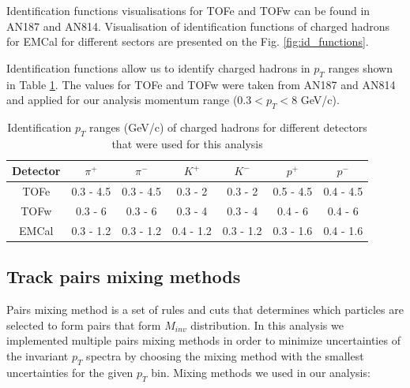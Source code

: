 Identification functions visualisations for TOFe and TOFw can be found in AN187 and AN814. Visualisation of identification functions of charged hadrons for EMCal for different sectors are presented on the Fig. \ref{fig:id_functions}.

Identification functions allow us to identify charged hadrons in $p_T$ ranges shown in Table \ref{table:id_pt_range}. The values for TOFe and TOFw were taken from AN187 and AN814 and applied for our analysis momentum range ($0.3 < p_T < 8$ GeV/c). 

\begin{table}[h!]
	\centering
	\begin{tabular}{ c || c | c | c | c | c | c }
		Detector & $\pi^+$ & $\pi^-$ & $K^+$ & $K^-$ & $p^+$ & $p^-$ \\
		\hline
		\hline
		TOFe & 0.3 - 4.5 & 0.3 - 4.5 & 0.3 - 2 & 0.3 - 2 & 0.5 - 4.5 & 0.4 - 4.5 \\
		TOFw & 0.3 - 6 & 0.3 - 6 & 0.3 - 4 & 0.3 - 4 & 0.4 - 6 & 0.4 - 6 \\
		EMCal & 0.3 - 1.2 & 0.3 - 1.2 & 0.4 - 1.2 & 0.3 - 1.2 & 0.3 - 1.6 & 0.4 - 1.6 \\
	\end{tabular}
	\caption{Identification $p_T$ ranges (GeV/c) of charged hadrons for different detectors that were used for this analysis}
	\label{table:id_pt_range}
\end{table}

\subsection{Track pairs mixing methods}

Pairs mixing method is a set of rules and cuts that determines which particles are selected to form pairs that form $M_{inv}$ distribution. In this analysis we implemented multiple \Kstar pairs mixing methods in order to minimize uncertainties of the invariant $p_T$ spectra by choosing the mixing method with the smallest uncertainties for the given $p_T$ bin. 
Mixing methods we used in our analysis:

